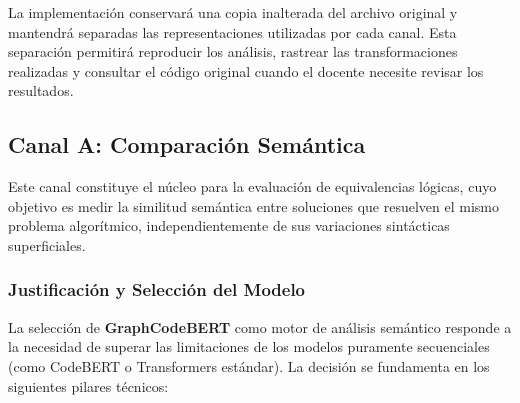 La implementación conservará una copia inalterada del archivo original y mantendrá separadas las representaciones utilizadas por cada canal. Esta separación permitirá reproducir los análisis, rastrear las transformaciones realizadas y consultar el código original cuando el docente necesite revisar los resultados.

\subsection{Canal A: Comparación Semántica}

Este canal constituye el núcleo para la evaluación de equivalencias lógicas, cuyo objetivo es medir la similitud semántica entre soluciones que resuelven el mismo problema algorítmico, independientemente de sus variaciones sintácticas superficiales.

\subsubsection{Justificación y Selección del Modelo}

La selección de \textbf{GraphCodeBERT} \cite{Guo2021GraphCodeBERT} como motor de análisis semántico responde a la necesidad de superar las limitaciones de los modelos puramente secuenciales (como CodeBERT o Transformers estándar). La decisión se fundamenta en los siguientes pilares técnicos:

